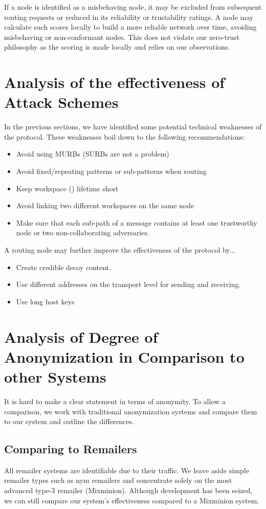 If a node is identified as a misbehaving node, it may be excluded from subsequent routing requests or reduced in its reliability or trustability ratings. A node may calculate such scores locally to build a more reliable network over time, avoiding misbehaving or non-conformant nodes. This does not violate our zero-trust philosophy as the scoring is made locally and relies on our observations.


\chapter{Analysis of the effectiveness of Attack Schemes}
In the previous sections, we have identified some potential technical weaknesses of the protocol. These weaknesses boil down to the following recommendations:
\begin{itemize}
	\item Avoid using MURBs (SURBs are not a problem)
	\item Avoid fixed/repeating patterns or sub-patterns when routing
	\item Keep workspace () lifetime short
	\item Avoid linking two different workspaces on the same node
	\item Make sure that each sub-path of a message contains at least one trustworthy node or two non-collaborating adversaries.
\end{itemize}

A routing node may further improve the effectiveness of the protocol by\ldots

\begin{itemize}
	\item Create credible decoy content.
	\item Use different addresses on the transport level for sending and receiving.
	\item Use long host keys
\end{itemize}

\chapter[Degree of Anonymization in Comparison]{Analysis of Degree of Anonymization \MessageVortex{} in Comparison to other Systems}
It is hard to make a clear statement in terms of anonymity. To allow a comparison, we work with traditional anonymization systems and compare them to our system and outline the differences. 

\section{Comparing \MessageVortex{} to Remailers}
All remailer systems are identifiable due to their traffic.  We leave aside simple remailer types such as nym remailers and concentrate solely on the most advanced type-3 remailer (Mixminion). Although development has been seized, we can still compare our system's effectiveness compared to a Mixminion system.

